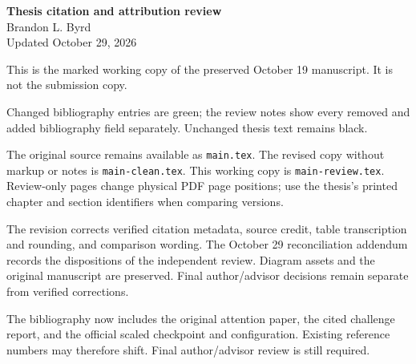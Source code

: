 \hypersetup{pageanchor=false}
\begin{titlepage}
\thispagestyle{empty}
\begin{center}
{\Large\bfseries Thesis citation and attribution review}\\[12pt]
Brandon L. Byrd\\
Updated October 29, 2026
\end{center}
\vspace{18pt}
This is the marked working copy of the preserved October 19 manuscript. It is not the submission copy.

  Changed bibliography entries are green; the review notes show every removed and added bibliography field separately. Unchanged thesis text remains black.

The original source remains available as \texttt{main.tex}. The revised copy without markup or notes is \texttt{main-clean.tex}. This working copy is \texttt{main-review.tex}. Review-only pages change physical PDF page positions; use the thesis's printed chapter and section identifiers when comparing versions.

The revision corrects verified citation metadata, source credit, table transcription and rounding, and comparison wording. The October 29 reconciliation addendum records the dispositions of the independent review. Diagram assets and the original manuscript are preserved. Final author/advisor decisions remain separate from verified corrections.

The bibliography now includes the original attention paper, the cited challenge report, and the official scaled checkpoint and configuration. Existing reference numbers may therefore shift. Final author/advisor review is still required.
\end{titlepage}
